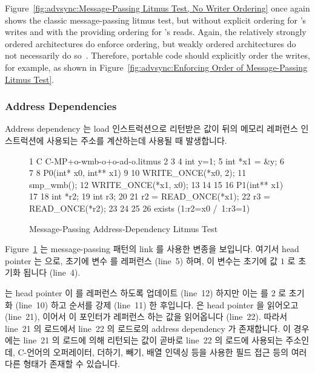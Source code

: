 Figure~\ref{fig:advsync:Message-Passing Litmus Test, No Writer Ordering}
once again shows the classic message-passing litmus test, but without
explicit ordering for 's writes and with the 
providing ordering for 's reads.
Again, the relatively strongly ordered architectures do enforce ordering,
but weakly ordered architectures do not necessarily do
so~\cite{JadeAlglave2011ppcmem}.
Therefore, portable code should explicitly order the writes, for
example, as shown in
Figure~\ref{fig:advsync:Enforcing Order of Message-Passing Litmus Test}.
\fi

\subsubsection{Address Dependencies}
\label{sec:advsync:Address Dependencies}

Address dependency 는 load 인스트럭션으로 리턴받은 값이 뒤의 메모리 레퍼런스
인스트럭션에 사용되는 주소를 계산하는데 사용될 때 발생합니다.

\begin{figure}[tbp]
{ \scriptsize
\begin{verbbox}
 1 C C-MP+o-wmb-o+o-ad-o.litmus
 2
 3 {
 4 int y=1;
 5 int *x1 = &y;
 6 }
 7
 8 P0(int* x0, int** x1) {
 9
10   WRITE_ONCE(*x0, 2);
11   smp_wmb();
12   WRITE_ONCE(*x1, x0);
13
14 }
15
16 P1(int** x1) {
17
18   int *r2;
19   int r3;
20
21   r2 = READ_ONCE(*x1);
22   r3 = READ_ONCE(*r2);
23
24 }
25
26 exists (1:r2=x0 /\ 1:r3=1)
\end{verbbox}
}
\centering
\theverbbox
\caption{Message-Passing Address-Dependency Litmus Test}
\label{fig:advsync:Message-Passing Address-Dependency Litmus Test}
\end{figure}

Figure~\ref{fig:advsync:Message-Passing Address-Dependency Litmus Test}
는 message-passing 패턴의 link 를 사용한 변종을 보입니다.
여기서 head pointer 는  으로, 초기에  변수  를 레퍼런스
(line~5) 하며, 이 변수는 초기에 값 $1$ 로 초기화 됩니다 (line~4).

 는 head pointer  이  를 레퍼런스 하도록 업데이트
(line~12) 하지만 이는  를 $2$ 로 초기화 (line~10) 하고 순서를 강제
(line~11) 한 후입니다.
 은 head pointer  을 읽어오고 (line~21), 이어서 이 포인터가
레퍼런스 하는 값을 읽어옵니다 (line~22).
따라서 line~21 의 로드에서 line~22 의 로드로의 address dependency 가
존재합니다.
이 경우에는 line~21 의 로드에 의해 리턴되는 값이 곧바로 line~22 의 로드에
사용되는 주소인데, C-언어의 \co{->} 오퍼레이터, 더하기, 빼기, 배열 인덱싱 등을
사용한 필드 접근 등의 여러 다른 형태가 존재할 수 있습니다.


